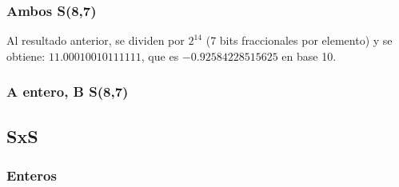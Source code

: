 \subsubsection{Ambos S(8,7)}
Al resultado anterior, se dividen por $2^{14}$ (7 bits fraccionales por elemento) y se obtiene: $11.00010010111111$, que es $-0.92584228515625$ en base 10. 

\subsubsection{A entero, B S(8,7)}

\subsection{SxS}

\subsubsection{Enteros}
